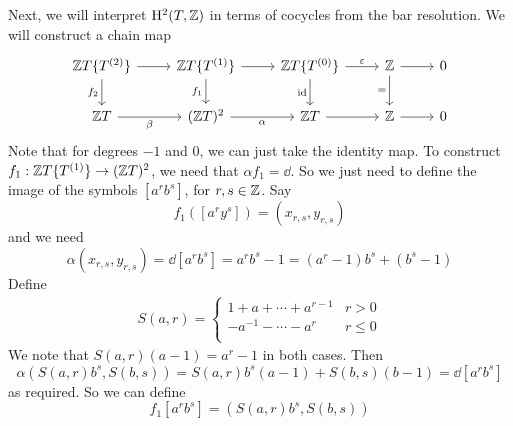 \documentclass{article}
\begin{document}
\begin{example}
    Next, we will interpret \(\mathrm{H}^2(T, \mathbb{Z})\) in terms of cocycles from the bar resolution. We will construct a chain map
\[\begin{tikzcd}
	{\Z T\{T^{(2)}\}} & {\Z T\{T^{(1)}\}} & {\Z T\{T^{(0)}\}} & \Z & 0 \\
	{\Z T} & {(\Z T)^2} & {\Z T} & \Z & 0
	\arrow[from=1-1, to=1-2]
	\arrow[from=1-2, to=1-3]
	\arrow["\epsilon", from=1-3, to=1-4]
	\arrow[from=1-4, to=1-5]
	\arrow["\beta"', from=2-1, to=2-2]
	\arrow["\alpha"', from=2-2, to=2-3]
	\arrow["\id"', from=1-3, to=2-3]
	\arrow[from=2-3, to=2-4]
	\arrow["{=}"', from=1-4, to=2-4]
	\arrow[from=2-4, to=2-5]
	\arrow["{f_1}"', from=1-2, to=2-2]
	\arrow["{f_2}"', from=1-1, to=2-1]
\end{tikzcd}\]
    Note that for degrees \(-1\) and \(0\), we can just take the identity map. To construct \(f_1 : \mathbb{Z} T\{T^{(1)}\} \to (\mathbb{Z} T)^2\), we need that \(\alpha f_1 = \dd\). So we just need to define the image of the symbols \([a^rb^s]\), for \(r, s \in \mathbb{Z}\). Say
    \[f_1([a^ry^s]) = (x_{r,s}, y_{r, s})\]
    and we need
    \[\alpha(x_{r, s}, y_{r, s}) = \dd[a^rb^s] = a^rb^s - 1 = (a^r - 1)b^s + (b^s - 1)\]
    Define
    \begin{align*}
        S(a, r) = \begin{cases}
            1 + a + \cdots + a^{r - 1} & r > 0 \\
            -a^{-1} - \cdots - a^r & r \le 0 \\
        \end{cases}
    \end{align*}
    We note that \(S(a, r)(a - 1) = a^r - 1\) in both cases. Then
    \[\alpha(S(a, r)b^s, S(b, s)) = S(a, r)b^s(a - 1) + S(b, s)(b - 1) = \dd[a^rb^s]\]
    as required. So we can define
    \[f_1[a^rb^s] = (S(a, r)b^s, S(b, s))\]
\end{example}

\lec
\end{document}
